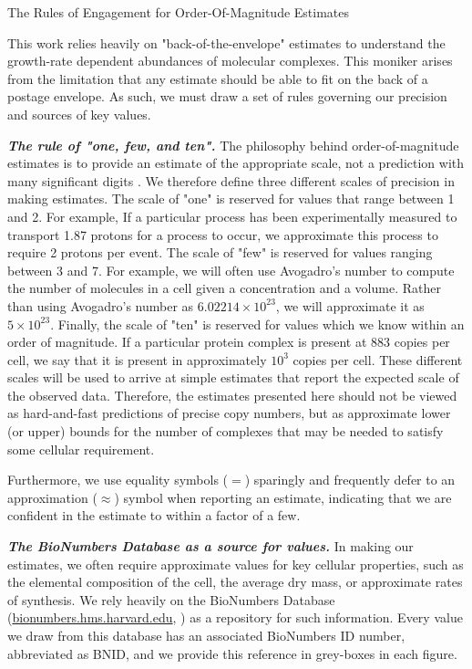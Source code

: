 \begin{featurebox}
\caption{The Rules of Engagement for Order-Of-Magnitude Estimates}
This work relies heavily on "back-of-the-envelope" estimates to understand
the growth-rate dependent abundances of molecular complexes. This moniker
arises from the limitation that any estimate should be able to fit on the
back of a postage envelope. As such, we must draw a set of rules governing
our precision and sources of key values.

\textbf{\itshape The rule of "one, few, and ten".} The philosophy behind
order-of-magnitude estimates is to provide an estimate of the appropriate scale,
not a prediction with many significant digits \citep{mahajan2010}. We therefore define three different
scales of precision in making estimates. The scale of "one" is reserved for
values that range between 1 and 2. For example, If a particular process has been
experimentally measured to transport 1.87 protons for a process to occur, we approximate
this process to require 2 protons per event. The scale of "few" is reserved for
values ranging between 3 and 7. For example, we will often use Avogadro's number
to compute the number of molecules in a cell given a concentration and a volume.
Rather than using Avogadro's number as $6.02214 \times 10^{23}$, we will
approximate it as $5 \times 10^{23}$. Finally, the scale of "ten" is reserved
for values which we know within an order of magnitude. If a particular protein
complex is present at 883 copies per cell, we say that it is present in
approximately $10^3$ copies per cell. These different scales will be used
to arrive at simple estimates that report the expected scale of the
observed data. Therefore, the estimates  presented here should not be viewed as
hard-and-fast predictions of precise copy numbers, but as approximate lower (or upper)
bounds for the number of complexes that may be needed to satisfy some cellular requirement.

Furthermore, we use equality symbols ($=$) sparingly and frequently defer to
an approximation ($\approx$) symbol when reporting an estimate, indicating that 
we are confident in the estimate to within a factor of a few.  

\textbf{\itshape The BioNumbers Database as a source for values.} In making our
estimates, we often require approximate values for key cellular properties, such
as the elemental composition of the cell, the average dry mass, or approximate
rates of synthesis. We rely heavily on the BioNumbers Database
(\href{https://bionumbers.hms.harvard.edu}{bionumbers.hms.harvard.edu},
\cite{milo2010}) as a repository for such information. Every value we draw from this database has
an associated BioNumbers ID number, abbreviated as BNID, and we provide this
reference in grey-boxes in each  figure.


\end{featurebox}
